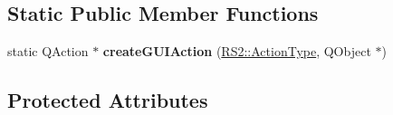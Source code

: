 \subsection*{Static Public Member Functions}
\begin{DoxyCompactItemize}
\item 
\hypertarget{classRS__ActionDrawPolyline_acfe5693e6731116b0492063cb9481ba9}{static Q\-Action $\ast$ {\bfseries create\-G\-U\-I\-Action} (\hyperlink{classRS2_afe3523e0bc41fd637b892321cfc4b9d7}{R\-S2\-::\-Action\-Type}, Q\-Object $\ast$)}\label{classRS__ActionDrawPolyline_acfe5693e6731116b0492063cb9481ba9}

\end{DoxyCompactItemize}
\subsection*{Protected Attributes}
